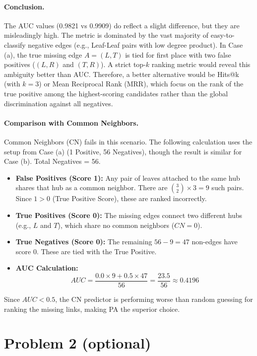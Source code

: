 \documentclass[11pt]{article}
\begin{document}
\paragraph{Conclusion.}
The AUC values (0.9821 vs 0.9909) do reflect a slight difference, but they are misleadingly high. The metric is dominated by the vast majority of easy-to-classify negative edges (e.g., Leaf-Leaf pairs with low degree product).
In Case (a), the true missing edge $A=(L,T)$ is tied for first place with two false positives ($(L,R)$ and $(T,R)$). A strict top-$k$ ranking metric would reveal this ambiguity better than AUC.
Therefore, a better alternative would be Hits@k (with $k=3$) or Mean Reciprocal Rank (MRR), which focus on the rank of the true positive among the highest-scoring candidates rather than the global discrimination against all negatives.

\paragraph{Comparison with Common Neighbors.}
Common Neighbors (CN) fails in this scenario.
The following calculation uses the setup from Case (a) (1 Positive, 56 Negatives), though the result is similar for Case (b).
Total Negatives = 56.
\begin{itemize}
    \item \textbf{False Positives (Score 1):} Any pair of leaves attached to the same hub shares that hub as a common neighbor. There are $\binom{3}{2} \times 3 = 9$ such pairs. Since $1 > 0$ (True Positive Score), these are ranked incorrectly.
    \item \textbf{True Positives (Score 0):} The missing edges connect two different hubs (e.g., $L$ and $T$), which share no common neighbors ($CN=0$).
    \item \textbf{True Negatives (Score 0):} The remaining $56 - 9 = 47$ non-edges have score 0. These are tied with the True Positive.
    \item \textbf{AUC Calculation:}
    $$ AUC = \frac{0.0 \times 9 + 0.5 \times 47}{56} = \frac{23.5}{56} \approx 0.4196 $$
\end{itemize}
Since $AUC < 0.5$, the CN predictor is performing worse than random guessing for ranking the missing links, making PA the superior choice.

\newpage
\section*{Problem 2 (optional)}
\end{document}
